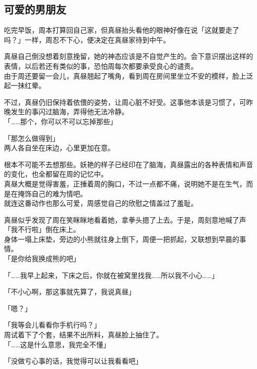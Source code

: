 \subsection{可爱的男朋友}

吃完早饭，周本打算回自己家，但真昼抬头看他的眼神好像在说「这就要走了吗？」一样，周忍不下心，便决定在真昼家待到中午。

真昼自己倒没想着刻意挽留，她的神态应该是不自觉产生的。会下意识摆出这样的表情，以后若还有类似的事，恐怕周每次都要承受良心的谴责。\\

由于周还要留一会儿，真昼翘起了嘴角，看到周在房间里坐立不安的模样，脸上泛起一抹红晕。

不过，真昼仍旧保持着依偎的姿势，让周心脏不好受。这事他本该是习惯了，可昨晚发生的事闪过脑海，弄得他无法冷静。\\

「……那个，你可以不可以忘掉那些」

「那怎么做得到」\\

两人各自坐在床边，心里更加在意。

根本不可能不去想那些。妖艳的样子已经印在了脑海，真昼露出的各种表情和声音的变化，也全都留在周的记忆中。\\

真昼大概是觉得害羞，正捶着周的胸口，不过一点都不痛，说明她不是在生气，而是在掩饰自己的难为情吧。\\

就连这番动作也那么可爱，周感觉自己的欣慰之情盖过了羞耻。

真昼似乎发现了周在笑眯眯地看着她，拿拳头摁了上去。于是，周刻意地喊了声「我不行啦」倒在床上。\\

身体一塌上床垫，旁边的小熊就往身上倒下，周便一把抓起，又联想到早晨的事情。\\

「是你给我换成熊的吧」

「……我早上起来，下床之后，你就在被窝里找我……所以我不小心……」

「不小心啊，那这事就先算了，我说真昼」

「嗯？」

「我等会儿看看你手机行吗？」\\

周试着下了个套，结果不出所料，真昼脸上抽住了。\\

「……这是什么意思，我完全不懂」

「没做亏心事的话，我觉得可以让我看看吧」

